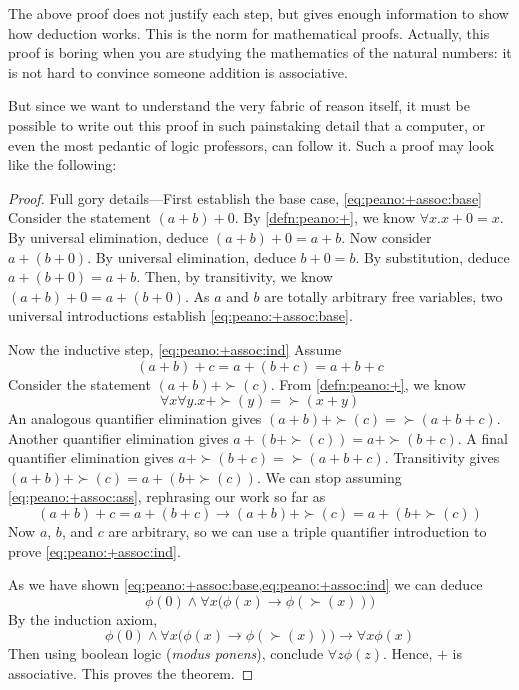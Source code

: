 \message{ !name(truth.tex)}\documentclass{scrbook}
\renewcommand{\implies}{\to}
\begin{document}
The above proof does not justify each step, but gives enough information to show how deduction works. This is the norm for mathematical proofs. Actually, this proof is boring when you are studying the mathematics of the natural numbers: it is not hard to convince someone addition is associative. 

But since we want to understand the very fabric of reason itself, it must be possible to write out this proof in such painstaking detail that a computer, or even the most pedantic of logic professors, can follow it. Such a proof may look like the following: 

\begin{proof}
  Full gory details---First establish the base case, \cref{eq:peano:+assoc:base}
  Consider the statement $(a+b)+0$. By \cref{defn:peano:+}, we know $\forall x . x+0=x$. By universal elimination, deduce $(a+b)+0=a+b$. Now consider
  $a+(b+0)$. By universal elimination, deduce $b+0=b$. By substitution, deduce $a+(b+0)=a+b$. Then, by transitivity, we know $(a+b)+0=a+(b+0)$. As $a$ and $b$ are totally arbitrary free variables, two universal introductions establish \cref{eq:peano:+assoc:base}.

  Now the inductive step, \cref{eq:peano:+assoc:ind}
  Assume \begin{equation}(a+b)+c=a+(b+c)=a+b+c\label{eq:peano:+assoc:ass}\end{equation}
  Consider the statement $(a+b)+\succ (c)$. From \cref{defn:peano:+}, we know
  \[\forall x \forall y . x+\succ(y)=\succ(x+y)\]
  An analogous quantifier elimination gives $(a+b)+\succ (c) = \succ(a+b+c)$. 
  Another quantifier elimination gives $a+(b+\succ(c))= a+\succ(b+c)$. A final quantifier elimination gives $a+\succ(b+c)=\succ(a+b+c)$. Transitivity gives $(a+b)+\succ(c)=a+(b+\succ(c))$. We can stop assuming \cref{eq:peano:+assoc:ass}, rephrasing our work so far as
  \[
  (a+b)+c=a+(b+c)\implies (a+b)+\succ(c) = a+(b+\succ (c))
  \]
  Now $a$, $b$, and $c$ are arbitrary, so we can use a triple quantifier introduction to prove \cref{eq:peano:+assoc:ind}. 

  As we have shown \cref{eq:peano:+assoc:base,eq:peano:+assoc:ind} we can deduce 
  \begin{equation}
    \label{eq:peano:+assoc:both}
    \phi(0)\wedge \forall x \bigl(\phi(x)\implies \phi(\succ(x))\bigr)
  \end{equation}
  By the induction axiom, 
  \[
  \phi(0)\wedge \forall x \bigl(\phi(x)\implies \phi(\succ(x))\bigr) \implies \forall x \phi(x)
  \]
  Then using boolean logic (\emph{modus ponens}), conclude $\forall z \phi(z)$. Hence, $+$ is associative. This proves the theorem. 
\end{proof}
\end{document}
